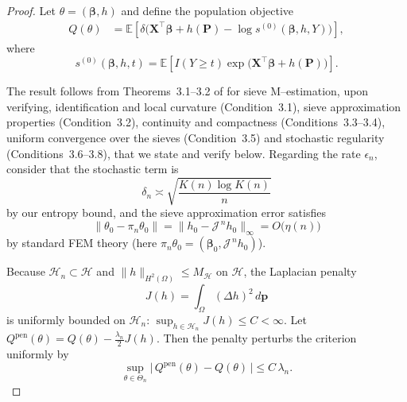 \documentclass[11pt]{article}
\begin{document}
	\begin{proof}
		Let \(\theta=(\bm\beta,h)\) and define the population objective
        \begin{align*}
        Q(\theta)
          &= \mathbb{E}\!\left[
              \delta\Big(\bm X^\top\bm\beta + h(\bm P) - \log s^{(0)}(\bm\beta,h,Y)\Big)
             \right],
        \end{align*}
        where
        \[
        s^{(0)}(\bm\beta,h,t)
          = \mathbb{E}\!\left[I(Y\ge t)\exp\!\big(\bm X^\top\bm\beta + h(\bm P)\big)\right].
        \]
        
        The result follows from Theorems~3.1–3.2 of \cite{chen2007large} for sieve M–estimation, upon verifying, identification and local curvature (Condition~3.1), sieve approximation properties (Condition~3.2), continuity and compactness (Conditions~3.3–3.4), uniform convergence over the sieves (Condition~3.5) and stochastic regularity (Conditions~3.6–3.8), that we state and verify below. Regarding the rate $\epsilon_n$, consider that the stochastic term is
        \[
        \delta_n \asymp \sqrt{\frac{K(n)\log K(n)}{n}}
        \]
        by our entropy bound, and the sieve approximation error satisfies
        \[
        \|\theta_0-\pi_n\theta_0\|
         = \|h_0-\mathcal J^{\,n}h_0\|_\infty
         = O\!\big(\eta(n)\big)
        \]
        by standard FEM theory (here \(\pi_n\theta_0=(\bm\beta_0,\mathcal J^{\,n}h_0)\)).
        
        Because \(\mathcal H_n\subset\mathcal H\) and \(\|h\|_{H^2(\Omega)}\le M_{\mathcal H}\) on \(\mathcal H\), the Laplacian penalty
        \[
        J(h)=\int_\Omega (\Delta h)^2\,d\bm p
        \]
        is uniformly bounded on \(\mathcal H_n\):
        \(\sup_{h\in\mathcal H_n} J(h)\le C<\infty\).
        Let \(Q^{\mathrm{pen}}(\theta)=Q(\theta)-\tfrac{\lambda_n}{2}J(h)\).
        Then the penalty perturbs the criterion uniformly by
        \begin{equation}\label{eq:penalty-perturb}
        \sup_{\theta\in\Theta_n}\bigl|\,Q^{\mathrm{pen}}(\theta)-Q(\theta)\,\bigr|
        \le C\,\lambda_n .
        \end{equation}
        

\end{proof}
\end{document}
